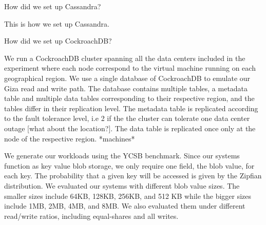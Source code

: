 {How did we set up Cassandra?

This is how we set up Cassandra.

How did we set up CockroachDB?

We run a CockroachDB cluster spanning all the data centers included in the experiment where each node correspond to the virtual machine running on each geographical region. We use a single database of CockroachDB to emulate our Giza read and write path. The database contains multiple tables, a metadata table and multiple data tables corresponding to their respective region, and the tables differ in their replication level. The metadata table is replicated according to the fault tolerance level, i.e 2 if the the cluster can tolerate one data center outage [what about the location?]. The data table is replicated once only at the node of the respective region.
*machines*

We generate our workloads using the YCSB benchmark. Since our systems function as key value blob storage, we only require one field, the blob value, for each key. The probability that a given key will be accessed is given by the Zipfian distribution. We evaluated our systems with different blob value sizes. The smaller sizes include 64KB, 128KB, 256KB, and 512 KB while the bigger sizes include 1MB, 2MB, 4MB, and 8MB. We also evaluated them under different read/write ratios, including equal-shares and all writes.

}
